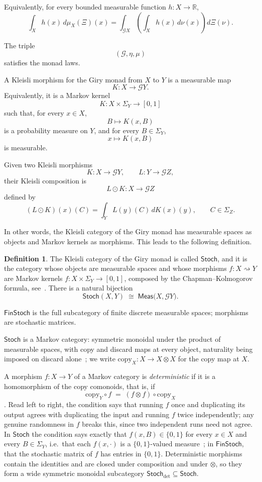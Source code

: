 \documentclass[11pt,a4paper]{article}
\theoremstyle{plain}
\theoremstyle{definition}
\newtheorem{definition}[theorem]{Definition}
\theoremstyle{remark}
\newcommand{\cat}[1]{\mathsf{#1}}
\newcommand{\Meas}{\cat{Meas}}
\newcommand{\Stoch}{\cat{Stoch}}
\newcommand{\FinStoch}{\cat{FinStoch}}
\newcommand{\G}{\mathcal{G}}
\begin{document}
Equivalently, for every bounded measurable function \(h:X\to\mathbb R\),
\[
\int_X h(x)\,d\mu_X(\Xi)(x)
=
\int_{\G X}
\left(
\int_X h(x)\,d\nu(x)
\right)
d\Xi(\nu).
\]

The triple
\[
(\G,\eta,\mu)
\]
satisfies the monad laws.

A Kleisli morphism for the Giry monad from \(X\) to \(Y\) is a measurable map
\[
K:X\to\G Y.
\]
Equivalently, it is a Markov kernel
\[
K:X\times\Sigma_Y\to[0,1]
\]
such that, for every \(x\in X\),
\[
B\mapsto K(x,B)
\]
is a probability measure on \(Y\), and for every \(B\in\Sigma_Y\),
\[
x\mapsto K(x,B)
\]
is measurable.

Given two Kleisli morphisms
\[
K:X\to\G Y,
\qquad
L:Y\to\G Z,
\]
their Kleisli composition is
\[
L\odot K:X\to\G Z
\]
defined by
\[
(L\odot K)(x)(C)
=
\int_Y L(y)(C)\,dK(x)(y),
\qquad
C\in\Sigma_Z.
\]

In other words, the Kleisli category of the Giry monad has measurable spaces as objects and Markov kernels as morphisms. This leads to the following definition.

\begin{definition}
The Kleisli category of the Giry monad is called $\Stoch$, and it is the category whose objects are measurable spaces and whose morphisms $f \colon X \rightsquigarrow Y$ are Markov kernels
$f \colon X \times \Sigma_Y \to [0,1]$, composed by the
Chapman--Kolmogorov formula, see~\cite{fritz_synthetic_2020, giry_categorical_1982,perrone_markov_2024}.
There is a natural bijection
\begin{equation}\label{eq:kleisli}
\Stoch(X, Y) \;\cong\; \Meas\bigl(X, \G Y\bigr).
\end{equation}

$\FinStoch$ is the full subcategory of finite discrete measurable spaces;
morphisms are stochastic matrices. 

$\Stoch$ is a Markov category: symmetric
monoidal under the product of measurable spaces, with copy and discard maps at
every object, naturality being imposed on discard
alone~\cite[Def.~2.1]{fritz_synthetic_2020}; we write
$\mathrm{copy}_{X} \colon X \to X \otimes X$ for the copy map at $X$.

A morphism $f \colon X \to Y$ of a Markov category is \emph{deterministic} if
it is a homomorphism of the copy comonoids, that is, if
\[
\mathrm{copy}_{Y} \circ f \;=\; (f \otimes f) \circ \mathrm{copy}_{X}
\]
\cite[Def.~10.1]{fritz_synthetic_2020}. 
Read left to right, the condition
says that running $f$ once and duplicating its output agrees with duplicating
the input and running $f$ twice independently; any genuine randomness in $f$
breaks this, since two independent runs need not agree. In $\Stoch$ the
condition says exactly that $f(x,B) \in \{0,1\}$ for every $x \in X$ and every
$B \in \Sigma_{Y}$, i.e.\ that each $f(x,\cdot)$ is a $\{0,1\}$-valued
measure~\cite[Ex.~10.4]{fritz_synthetic_2020}; in $\FinStoch$, that the
stochastic matrix of $f$ has entries in $\{0,1\}$. Deterministic morphisms
contain the identities and are closed under composition and under $\otimes$,
so they form a wide symmetric monoidal subcategory
$\Stoch_{\det} \subseteq \Stoch$.

\end{definition}
\end{document}
